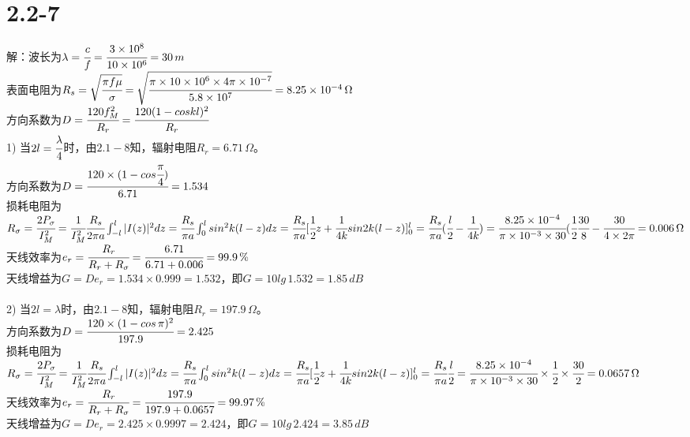 \documentclass[a4paper,11pt]{article}
\begin{document}
\section{2.2-7}
解：波长为$\lambda=\cfrac{c}{f}=\cfrac{3\times 10^8}{10\times 10^6}=30\,m$\\
表面电阻为$R_s=\sqrt{\cfrac{\pi f\mu}{\sigma}}=\sqrt{\cfrac{\pi\times 10\times 10^6\times 4\pi \times 10^{-7}}{5.8\times 10^7}}=8.25\times 10^{-4}\,\Omega$\\
方向系数为$D=\cfrac{120f_M^2}{R_r}=\cfrac{120(1-coskl)^2}{R_r}$\\
1) 当$2l=\cfrac{\lambda}{4}$时，由$2.1-8$知，辐射电阻$R_r=6.71\,\Omega$。\\
方向系数为$D=\cfrac{120\times (1-cos\cfrac{\pi}{4})}{6.71}=1.534$\\
损耗电阻为$R_{\sigma}=\cfrac{2P_{\sigma}}{I^2_M}=\cfrac{1}{I^2_M}\cfrac{R_s}{2\pi a}\int_{-l}^{l}|I(z)|^2dz=\cfrac{R_s}{\pi a}\int_0^lsin^2k(l-z)dz=\cfrac{R_s}{\pi a}[\cfrac{1}{2}z+\cfrac{1}{4k}sin 2k(l-z)]_0^l=\cfrac{R_s}{\pi a}(\cfrac{l}{2}-\cfrac{1}{4k})=\cfrac{8.25\times 10^{-4}}{\pi\times 10^{-3}\times 30}(\cfrac{1}{2}\cfrac{30}{8}-\cfrac{30}{4\times 2\pi}=0.006\,\Omega$\\
天线效率为$e_r=\cfrac{R_r}{R_r+R_{\sigma}}=\cfrac{6.71}{6.71+0.006}=99.9\,\%$\\
天线增益为$G=De_r=1.534\times 0.999=1.532$，即$G=10lg\,1.532=1.85\,dB$\\
\\
2) 当$2l=\lambda$时，由$2.1-8$知，辐射电阻$R_r=197.9\,\Omega$。\\
方向系数为$D=\cfrac{120\times (1-cos\,\pi)^2}{197.9}=2.425$\\
损耗电阻为$R_{\sigma}=\cfrac{2P_{\sigma}}{I^2_M}=\cfrac{1}{I^2_M}\cfrac{R_s}{2\pi a}\int_{-l}^{l}|I(z)|^2dz=\cfrac{R_s}{\pi a}\int_0^lsin^2k(l-z)dz=\cfrac{R_s}{\pi a}[\cfrac{1}{2}z+\cfrac{1}{4k}sin 2k(l-z)]_0^l=\cfrac{R_s}{\pi a}\cfrac{l}{2}=\cfrac{8.25\times 10^{-4}}{\pi\times 10^{-3}\times 30}\times \cfrac{1}{2}\times\cfrac{30}{2}=0.0657\,\Omega$\\
天线效率为$e_r=\cfrac{R_r}{R_r+R_{\sigma}}=\cfrac{197.9}{197.9+0.0657}=99.97\,\%$\\
天线增益为$G=De_r=2.425\times 0.9997=2.424$，即$G=10lg\,2.424=3.85\,dB$\\
\end{document}
